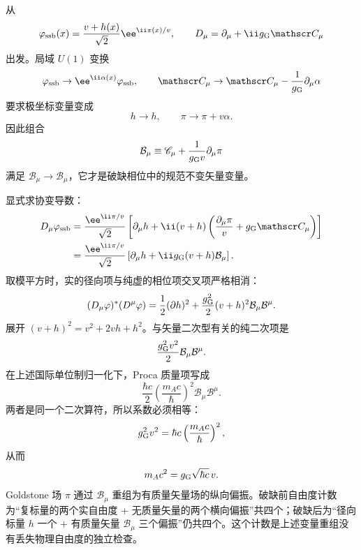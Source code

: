 \begin{derivation}
从
\[
\varphi_{\rm ssb}(x)
=\frac{v+h(x)}{\sqrt2}\ee^{\ii\pi(x)/v},
\qquad
D_\mu=\partial_\mu+\ii g_{\rm G}\mathscr C_\mu
\]
出发。局域 $U(1)$ 变换
\[
\varphi_{\rm ssb}\to \ee^{\ii\alpha(x)}\varphi_{\rm ssb},
\qquad
\mathscr C_\mu\to
\mathscr C_\mu-\frac1{g_{\rm G}}\partial_\mu\alpha
\]
要求极坐标变量变成
\[
h\to h,
\qquad
\pi\to\pi+v\alpha.
\]
因此组合
\[
\mathcal B_\mu
\equiv
\mathscr C_\mu+\frac1{g_{\rm G}v}\partial_\mu\pi
\]
满足 $\mathcal B_\mu\to\mathcal B_\mu$，它才是破缺相位中的规范不变矢量变量。

显式求协变导数：
\begin{align*}
D_\mu\varphi_{\rm ssb}
&=\frac{\ee^{\ii\pi/v}}{\sqrt2}
\left[
\partial_\mu h
+\ii(v+h)
\left(\frac{\partial_\mu\pi}{v}+g_{\rm G}\mathscr C_\mu\right)
\right]\\
&=\frac{\ee^{\ii\pi/v}}{\sqrt2}
\left[
\partial_\mu h
+\ii g_{\rm G}(v+h)\mathcal B_\mu
\right].
\end{align*}
取模平方时，实的径向项与纯虚的相位项交叉项严格相消：
\[
(D_\mu\varphi)^*(D^\mu\varphi)
=\frac12(\partial h)^2
+\frac{g_{\rm G}^2}{2}(v+h)^2\mathcal B_\mu\mathcal B^\mu.
\]
展开 $(v+h)^2=v^2+2vh+h^2$。与矢量二次型有关的纯二次项是
\[
\frac{g_{\rm G}^2v^2}{2}\mathcal B_\mu\mathcal B^\mu.
\]
在上述国际单位制归一化下，Proca 质量项写成
\[
\frac{\hbar c}{2}
\left(\frac{m_Ac}{\hbar}\right)^2
\mathcal B_\mu\mathcal B^\mu.
\]
两者是同一个二次算符，所以系数必须相等：
\[
g_{\rm G}^2v^2
=\hbar c\left(\frac{m_Ac}{\hbar}\right)^2,
\]
从而
\[
{m_Ac^2=g_{\rm G}\sqrt{\hbar c}\,v.}
\]
Goldstone 场 $\pi$ 通过 $\mathcal B_\mu$ 重组为有质量矢量场的纵向偏振。破缺前自由度计数为“复标量的两个实自由度 + 无质量矢量的两个横向偏振”共四个；破缺后为“径向标量 $h$ 一个 + 有质量矢量 $\mathcal B_\mu$ 三个偏振”仍共四个。这个计数是上述变量重组没有丢失物理自由度的独立检查。
\end{derivation}
